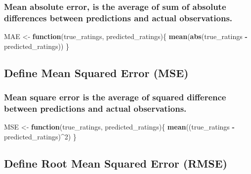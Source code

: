 \documentclass[
]{article}
\newenvironment{Shaded}{\begin{snugshade}}{\end{snugshade}}
\newcommand{\ControlFlowTok}[1]{\textcolor[rgb]{0.13,0.29,0.53}{\textbf{#1}}}
\newcommand{\DecValTok}[1]{\textcolor[rgb]{0.00,0.00,0.81}{#1}}
\newcommand{\KeywordTok}[1]{\textcolor[rgb]{0.13,0.29,0.53}{\textbf{#1}}}
\newcommand{\NormalTok}[1]{#1}
\newcommand{\OperatorTok}[1]{\textcolor[rgb]{0.81,0.36,0.00}{\textbf{#1}}}
\newcommand{\StringTok}[1]{\textcolor[rgb]{0.31,0.60,0.02}{#1}}
\begin{document}
\hypertarget{mean-absolute-error-is-the-average-of-sum-of-absolute-differences-between-predictions-and-actual-observations.}{%
\subsubsection{Mean absolute error, is the average of sum of absolute
differences between predictions and actual
observations.}\label{mean-absolute-error-is-the-average-of-sum-of-absolute-differences-between-predictions-and-actual-observations.}}

\begin{Shaded}
\begin{Highlighting}[]
\NormalTok{MAE <-}\StringTok{ }\ControlFlowTok{function}\NormalTok{(true_ratings, predicted_ratings)\{}
  \KeywordTok{mean}\NormalTok{(}\KeywordTok{abs}\NormalTok{(true_ratings }\OperatorTok{-}\StringTok{ }\NormalTok{predicted_ratings))}
\NormalTok{\}}
\end{Highlighting}
\end{Shaded}

\hypertarget{define-mean-squared-error-mse}{%
\subsection{Define Mean Squared Error
(MSE)}\label{define-mean-squared-error-mse}}

\hypertarget{mean-square-error-is-the-average-of-squared-difference-between-predictions-and-actual-observations.}{%
\subsubsection{Mean square error is the average of squared difference
between predictions and actual
observations.}\label{mean-square-error-is-the-average-of-squared-difference-between-predictions-and-actual-observations.}}

\begin{Shaded}
\begin{Highlighting}[]
\NormalTok{MSE <-}\StringTok{ }\ControlFlowTok{function}\NormalTok{(true_ratings, predicted_ratings)\{}
  \KeywordTok{mean}\NormalTok{((true_ratings }\OperatorTok{-}\StringTok{ }\NormalTok{predicted_ratings)}\OperatorTok{^}\DecValTok{2}\NormalTok{)}
\NormalTok{\}}
\end{Highlighting}
\end{Shaded}

\hypertarget{define-root-mean-squared-error-rmse}{%
\subsection{Define Root Mean Squared Error
(RMSE)}\label{define-root-mean-squared-error-rmse}}
\end{document}
